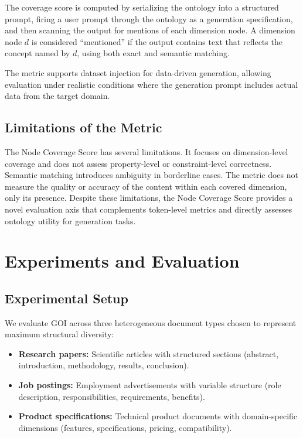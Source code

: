 \documentclass[runningheads,a4paper]{llncs}
\begin{document}
The coverage score is computed by serializing the ontology into a
structured prompt, firing a user prompt through the ontology as a
generation specification, and then scanning the output for mentions of
each dimension node. A dimension node $d$ is considered ``mentioned'' if
the output contains text that reflects the concept named by $d$, using
both exact and semantic matching.

The metric supports dataset injection for data-driven generation,
allowing evaluation under realistic conditions where the generation
prompt includes actual data from the target domain.

\subsection{Limitations of the Metric}

The Node Coverage Score has several limitations. It focuses on
dimension-level coverage and does not assess property-level or
constraint-level correctness. Semantic matching introduces ambiguity in
borderline cases. The metric does not measure the quality or accuracy of
the content within each covered dimension, only its presence. Despite
these limitations, the Node Coverage Score provides a novel evaluation
axis that complements token-level metrics and directly assesses ontology
utility for generation tasks.

\section{Experiments and Evaluation}
\label{sec:experiments}

\subsection{Experimental Setup}

We evaluate GOI across three heterogeneous document types chosen to
represent maximum structural diversity:

\begin{itemize}
  \item \textbf{Research papers:} Scientific articles with structured
    sections (abstract, introduction, methodology, results, conclusion).
  \item \textbf{Job postings:} Employment advertisements with variable
    structure (role description, responsibilities, requirements,
    benefits).
  \item \textbf{Product specifications:} Technical product documents
    with domain-specific dimensions (features, specifications, pricing,
    compatibility).
\end{itemize}
\end{document}
